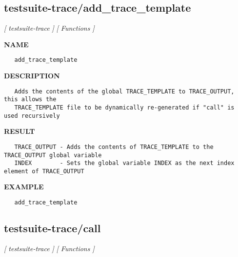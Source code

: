 \subsection{testsuite-trace/add\_trace\_template}
\textsl{[ testsuite-trace ]}
\textsl{[ Functions ]}

\label{ch:robo41}
\label{ch:testsuite_trace_add_trace_template}
\textbf{NAME}
\begin{verbatim}
   add_trace_template
\end{verbatim}
\textbf{DESCRIPTION}
\begin{verbatim}
   Adds the contents of the global TRACE_TEMPLATE to TRACE_OUTPUT, this allows the
   TRACE_TEMPLATE file to be dynamically re-generated if "call" is used recursively
\end{verbatim}
\textbf{RESULT}
\begin{verbatim}
   TRACE_OUTPUT - Adds the contents of TRACE_TEMPLATE to the TRACE_OUTPUT global variable
   INDEX        - Sets the global variable INDEX as the next index element of TRACE_OUTPUT
\end{verbatim}
\textbf{EXAMPLE}
\begin{verbatim}
   add_trace_template
\end{verbatim}
\newpage
\subsection{testsuite-trace/call}
\textsl{[ testsuite-trace ]}
\textsl{[ Functions ]}

